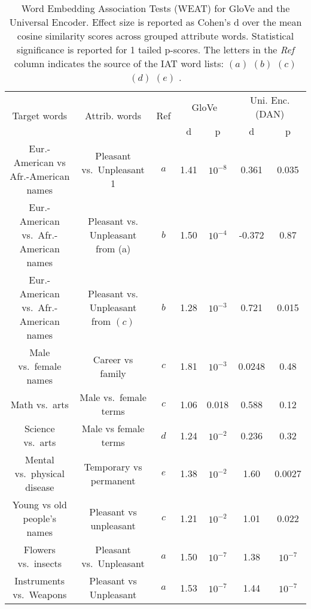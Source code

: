 \documentclass[11pt,a4paper]{article}
\begin{document}
\begin{table*}[ht!]
\footnotesize
\begin{center}

\begin{tabular}{|c|c|c|c|c|c|c|}
\hline
\multirow{2}{*}{Target words} & \multirow{2}{*}{Attrib. words} & \multirow{2}{*}{Ref} &
  \multicolumn{2}{|c|}{GloVe} &
  \multicolumn{2}{|c|}{ Uni. Enc. (DAN) } \\\cline{4-7}
  & & & d & p & d & p \\
\hline
Eur.-American
vs Afr.-American
names & Pleasant vs.\ 
Unpleasant 1 & $a$ & 1.41 & $10^{-8}$ & 0.361 & 0.035 \\
\hline
Eur.-American
vs.\ Afr.-American
names & Pleasant vs.
Unpleasant from (a) & $b$ & 1.50 & $10^{-4}$ & -0.372 & 0.87 \\
\hline
Eur.-American
vs.\ Afr.-American
names & Pleasant vs.
Unpleasant from $(c)$ & $b$ & 1.28 & $10^{-3}$ & 0.721 & 0.015 \\
\hline
Male vs.\ female
names & Career vs
family & $c$ & 1.81 & $10^{-3}$ & 0.0248 & 0.48 \\
\hline
Math vs.\ arts &
Male vs.\
female terms & $c$ & 1.06 & 0.018 & 0.588 & 0.12 \\
\hline
Science vs.\ arts & Male vs
female terms & $d$ & 1.24 & $10^{-2}$ & 0.236 & 0.32 \\
\hline
Mental vs.\
physical disease & Temporary vs
permanent & $e$ & 1.38 & $10^{-2}$ & 1.60 & 0.0027 \\
\hline
Young vs old
people’s names & Pleasant vs
unpleasant & $c$ & 1.21 & $10^{-2}$ & 1.01 & 0.022 \\
\hline
\hline
Flowers vs.\
insects & 
Pleasant vs.\ Unpleasant & $a$ & 1.50 & $10^{-7}$ & 1.38 & $10^{-7}$ \\
\hline
Instruments vs.\ Weapons &
Pleasant vs
Unpleasant & $a$ & 1.53 & $10^{-7}$ & 1.44 & $10^{-7}$  \\ 
\hline
\end{tabular}
\end{center}
\caption{Word Embedding Association Tests (WEAT) for GloVe and the Universal Encoder. Effect size is reported as Cohen's d over the mean cosine similarity scores across grouped attribute words. Statistical significance is reported for 1 tailed p-scores. The letters in the \emph{Ref} column indicates the source of the IAT word lists: $(a)$  $(b)$  $(c)$  $(d)$  $(e)$ .}
\label{tab:caliskancomp}
\end{table*}
\end{document}
